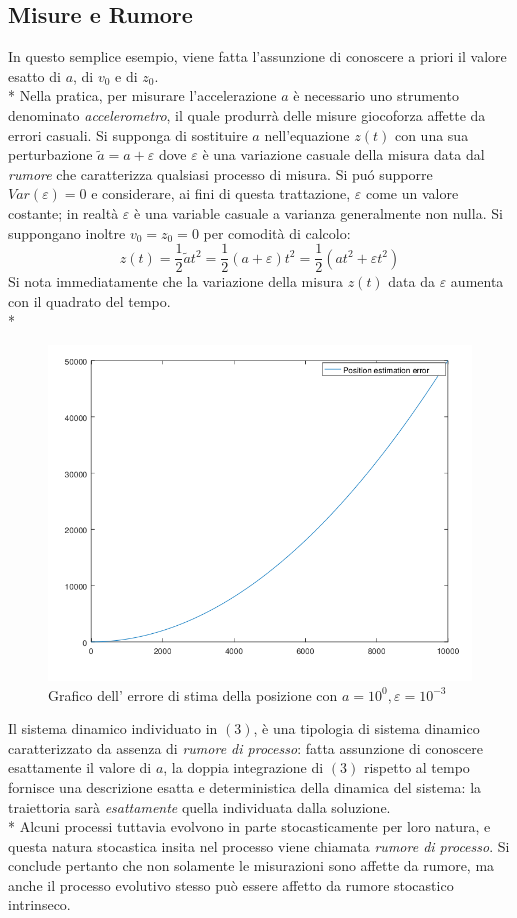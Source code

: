 \subsection{Misure e Rumore}
In questo semplice esempio, viene fatta l'assunzione di conoscere a priori il valore esatto di $a$, di $v_0$ e di $z_0$.\\*
Nella pratica, per misurare l'accelerazione $a$ \`e necessario uno strumento denominato \emph{accelerometro}, il quale produrr\`a delle misure giocoforza affette da errori casuali. Si supponga di sostituire $a$ nell'equazione $z(t)$ con una sua perturbazione $\tilde{a} = a + \varepsilon$ dove $\varepsilon$ \`e una variazione casuale della misura data dal \emph{rumore} che caratterizza qualsiasi processo di misura. Si pu\'o supporre $Var(\varepsilon) = 0$ e considerare, ai fini di questa trattazione, $\varepsilon$ come un valore costante; in realt\`a $\varepsilon$ \`e una variable casuale a varianza generalmente non nulla. Si suppongano inoltre $v_0 = z_0 = 0$ per comodit\`a di calcolo:
$$
z(t) = \frac{1}{2} \tilde{a} t^2 = \frac{1}{2}(a + \varepsilon) t^2 = \frac{1}{2} \left(at^2 + \varepsilon t^2\right)
$$
Si nota immediatamente che la variazione della misura $z(t)$ data da $\varepsilon$ aumenta con il quadrato del tempo.\\*
\begin{figure}[h]
	\centering
	\includegraphics[scale=0.5]{img/errormeas}
	\caption{Grafico dell' errore di stima della posizione con $a = 10^0, \varepsilon = 10^{-3}$}
	\label{fig:errormeas}
\end{figure}\newpage
Il sistema dinamico individuato in $(3)$, \`e una tipologia di sistema dinamico caratterizzato da assenza di \emph{rumore di processo}: fatta assunzione di conoscere esattamente il valore di $a$, la doppia integrazione di $(3)$ rispetto al tempo fornisce una descrizione esatta e deterministica della dinamica del sistema: la traiettoria sar\`a \emph{esattamente} quella individuata dalla soluzione.\\*
Alcuni processi tuttavia evolvono in parte stocasticamente per loro natura, e questa natura stocastica insita nel processo viene chiamata \emph{rumore di processo}. Si conclude pertanto che non solamente le misurazioni sono affette da rumore, ma anche il processo evolutivo stesso pu\`o essere affetto da rumore stocastico intrinseco.
\newpage
